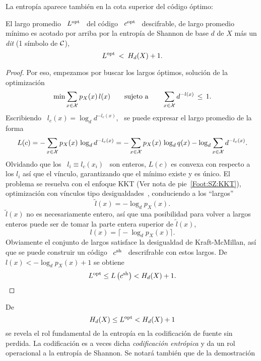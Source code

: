 La entrop\'ia aparece tambi\'en en la cota superior del c\'odigo \'optimo:
%
\begin{teorema}
\label{Teo:SZ:CotaSuperiorCodigoDescifrableOptimo}
%
  El largo promedio \ $L^{\mathrm{opt}}$ \ del c\'odigo \ $c^{\mathrm{opt}}$ \ descifrable, de largo
  promedio m\'inimo es  acotado por arriba por la entrop\'ia  de Shannon de base
  $d$ de $X$ m\'as un {\it dit} (1 s\'imbolo de $\mathcal{C}$),
  \[
  L^{\mathrm{opt}} \: < \: H_d(X) + 1.
  \]
\end{teorema}
%
\begin{proof}
  Por  eso,  empezamos  por  buscar  los  largos  \'optimos,  soluci\'on  de  la
  optimizaci\'on
  \[
  \min \sum_{x \in \mathcal{X}} p_X(x) \,  l(x) \qquad \mbox{sujeto a} \qquad \sum_{x \in
    \mathcal{X}} d^{-l(x)} \, \le \, 1.
  \]
  Escribiendo  \ $l_c(x) =  \log_d d^{-l_c(x)}$,  \ se  puede expresar  el largo
  promedio de la forma
  \[
  L(c) =  - \sum_{x  \in \mathcal{X}}  p_X(x) \, \log_d  d^{-l_c(x)} =  - \sum_{x  \in \mathcal{X}}
  p_X(x) \, \log_d q(x) - \log_d \sum_{x \in \mathcal{X}} d^{-l_c(x)}.
  \]
  Olvidando que los  \ $l_i \equiv l_c(x_i)$ \ son enteros,  $L(c)$ es convexa con
  respecto  a los $l_i$  as\'i que  el v\'inculo,  garantizando que  el m\'inimo
  existe y es \'unico.  El problema se resuelva con el enfoque KKT (Ver
    nota de pie~\ref{Foot:SZ:KKT}),
    optimizaci\'on  con  v\'inculos  tipo desigualdades~\cite{Mil00,  CamMar09},
    conduciendo a los ``largos''
  \[
  \widetilde{l}(x) = - \log_d p_X(x).
  \]
  $\widetilde{l}(x)$ no es necesariamente entero, as\'i que una posibilidad para
  volver  a largos  enteros  puede ser  de  tomar la  parte  entera superior  de
  $\widetilde{l}(x)$,
  \[
  l(x) = \Big\lceil\! - \log_d p_X(x) \Big\rceil.
  \]
  Obviamente el  conjunto de largos satisface la  desigualdad de Kraft-McMillan,
  as\'i que  se puede construir un  c\'odigo \ $c^{\mathrm{sh}}$ \  descrifrable con estos
  largos. De \ $l(x) < - \log_d p_X(x) + 1$ se obtiene
  \[
   L^{\mathrm{opt}} \le L\left( c^{\mathrm{sh}} \right) < H_d(X) + 1.
  \]
\end{proof}
%
De \[  H_d(X) \le  L^{\mathrm{opt}} < H_d(X)  + 1 \]  se revela  el rol fundamental  de la
entrop\'ia en la  codificaci\'on de fuente sin perdida.   La codificaci\'on es a
veces  dicha {\it  codificaci\'on  entr\'opica} y  da  un rol  operacional a  la
entrop\'ia  de  Shannon.   Se   notar\'a  tambi\'en  que  de  la  demostraci\'on
